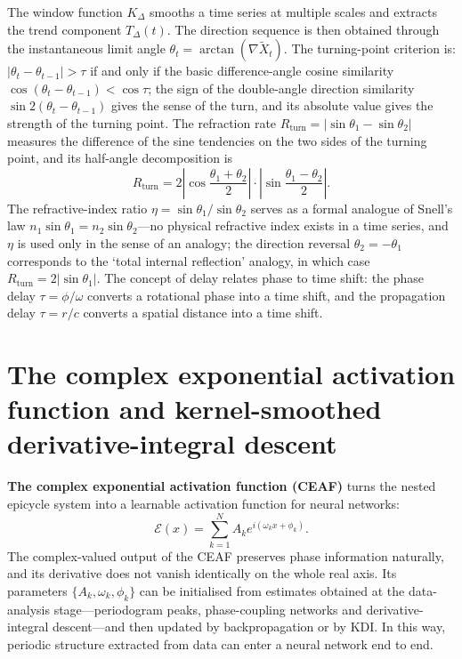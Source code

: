 The window function $K_\Delta$ smooths a time series at multiple scales and extracts the trend component $T_\Delta(t)$. The direction sequence is then obtained through the instantaneous limit angle $\theta_t = \arctan(\nabla \tilde{X}_t)$. The turning-point criterion is: $|\theta_t - \theta_{t-1}| > \tau$ if and only if the basic difference-angle cosine similarity $\cos(\theta_t - \theta_{t-1}) < \cos\tau$; the sign of the double-angle direction similarity $\sin 2(\theta_t - \theta_{t-1})$ gives the sense of the turn, and its absolute value gives the strength of the turning point. The refraction rate $R_{\text{turn}} = |\sin\theta_1 - \sin\theta_2|$ measures the difference of the sine tendencies on the two sides of the turning point, and its half-angle decomposition is
\[
R_{\text{turn}} = 2\left|\cos\frac{\theta_1+\theta_2}{2}\right| \cdot \left|\sin\frac{\theta_1-\theta_2}{2}\right|.
\]
The refractive-index ratio $\eta = \sin\theta_1/\sin\theta_2$ serves as a formal analogue of Snell's law $n_1\sin\theta_1 = n_2\sin\theta_2$---no physical refractive index exists in a time series, and $\eta$ is used only in the sense of an analogy; the direction reversal $\theta_2 = -\theta_1$ corresponds to the `total internal reflection' analogy, in which case $R_{\text{turn}} = 2|\sin\theta_1|$. The concept of delay relates phase to time shift: the phase delay $\tau = \phi/\omega$ converts a rotational phase into a time shift, and the propagation delay $\tau = r/c$ converts a spatial distance into a time shift.

\section{The complex exponential activation function and kernel-smoothed derivative-integral descent}

\textbf{The complex exponential activation function (CEAF)} turns the nested epicycle system into a learnable activation function for neural networks:
\[
\mathcal{E}(x) = \sum_{k=1}^{N} A_k e^{i(\omega_k x + \phi_k)}.
\]
The complex-valued output of the CEAF preserves phase information naturally, and its derivative does not vanish identically on the whole real axis. Its parameters $\{A_k,\omega_k,\phi_k\}$ can be initialised from estimates obtained at the data-analysis stage---periodogram peaks, phase-coupling networks and derivative-integral descent---and then updated by backpropagation or by KDI. In this way, periodic structure extracted from data can enter a neural network end to end.

